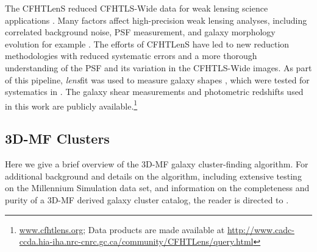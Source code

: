The \ac{CFHTLenS} reduced \ac{CFHTLS}-Wide data for weak lensing science applications \citep{Heymans12,Erben13}. Many factors affect high-precision weak lensing analyses, including correlated background noise, PSF measurement, and galaxy morphology evolution for example \citep[for a more detailed list and study, see][]{step2,Heymans12}. The efforts of \ac{CFHTLenS} have led to new reduction methodologies with reduced systematic errors and a more thorough understanding of the PSF and its variation in the \ac{CFHTLS}-Wide images. As part of this pipeline, {\em lens}fit was used to measure galaxy shapes \citep{Miller13}, which were tested for systematics in \citet{Heymans12}. The galaxy shear measurements and photometric redshifts used in this work are publicly available.\footnote[1]{\url{www.cfhtlens.org}; Data products are made available at \url{http://www.cadc-ccda.hia-iha.nrc-cnrc.gc.ca/community/CFHTLens/query.html}}


\subsection{\ac{3D-MF} Clusters}\label{3DMF}

Here we give a brief overview of the \ac{3D-MF} galaxy cluster-finding algorithm. For additional background and details on the algorithm, including extensive testing on the Millennium Simulation data set, and information on the completeness and purity of a \ac{3D-MF} derived galaxy cluster catalog, the reader is directed to \citet{Milkeraitis10}.

